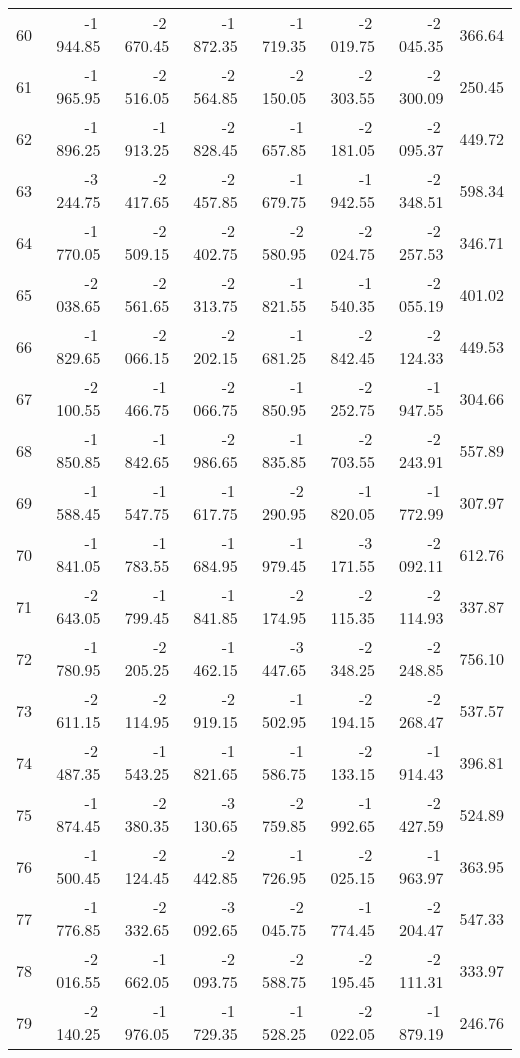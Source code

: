\begin{longtable}{rrrrrrrr}
60 & -1\,944.85 & -2\,670.45 & -1\,872.35 & -1\,719.35 & -2\,019.75 & -2\,045.35 & 366.64  \\
61 & -1\,965.95 & -2\,516.05 & -2\,564.85 & -2\,150.05 & -2\,303.55 & -2\,300.09 & 250.45  \\
62 & -1\,896.25 & -1\,913.25 & -2\,828.45 & -1\,657.85 & -2\,181.05 & -2\,095.37 & 449.72  \\
63 & -3\,244.75 & -2\,417.65 & -2\,457.85 & -1\,679.75 & -1\,942.55 & -2\,348.51 & 598.34  \\
64 & -1\,770.05 & -2\,509.15 & -2\,402.75 & -2\,580.95 & -2\,024.75 & -2\,257.53 & 346.71  \\
65 & -2\,038.65 & -2\,561.65 & -2\,313.75 & -1\,821.55 & -1\,540.35 & -2\,055.19 & 401.02  \\
66 & -1\,829.65 & -2\,066.15 & -2\,202.15 & -1\,681.25 & -2\,842.45 & -2\,124.33 & 449.53  \\
67 & -2\,100.55 & -1\,466.75 & -2\,066.75 & -1\,850.95 & -2\,252.75 & -1\,947.55 & 304.66  \\
68 & -1\,850.85 & -1\,842.65 & -2\,986.65 & -1\,835.85 & -2\,703.55 & -2\,243.91 & 557.89  \\
69 & -1\,588.45 & -1\,547.75 & -1\,617.75 & -2\,290.95 & -1\,820.05 & -1\,772.99 & 307.97  \\
70 & -1\,841.05 & -1\,783.55 & -1\,684.95 & -1\,979.45 & -3\,171.55 & -2\,092.11 & 612.76  \\
71 & -2\,643.05 & -1\,799.45 & -1\,841.85 & -2\,174.95 & -2\,115.35 & -2\,114.93 & 337.87  \\
72 & -1\,780.95 & -2\,205.25 & -1\,462.15 & -3\,447.65 & -2\,348.25 & -2\,248.85 & 756.10  \\
73 & -2\,611.15 & -2\,114.95 & -2\,919.15 & -1\,502.95 & -2\,194.15 & -2\,268.47 & 537.57  \\
74 & -2\,487.35 & -1\,543.25 & -1\,821.65 & -1\,586.75 & -2\,133.15 & -1\,914.43 & 396.81  \\
75 & -1\,874.45 & -2\,380.35 & -3\,130.65 & -2\,759.85 & -1\,992.65 & -2\,427.59 & 524.89  \\
76 & -1\,500.45 & -2\,124.45 & -2\,442.85 & -1\,726.95 & -2\,025.15 & -1\,963.97 & 363.95  \\
77 & -1\,776.85 & -2\,332.65 & -3\,092.65 & -2\,045.75 & -1\,774.45 & -2\,204.47 & 547.33  \\
78 & -2\,016.55 & -1\,662.05 & -2\,093.75 & -2\,588.75 & -2\,195.45 & -2\,111.31 & 333.97  \\
79 & -2\,140.25 & -1\,976.05 & -1\,729.35 & -1\,528.25 & -2\,022.05 & -1\,879.19 & 246.76  \\

\end{longtable}
